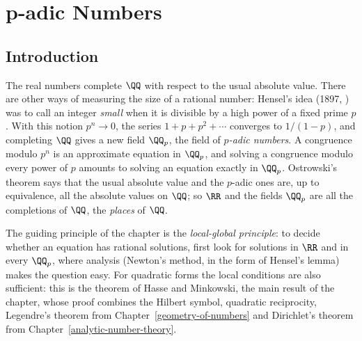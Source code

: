 \chapter{p-adic Numbers}\label{p-adic-numbers}

\section{Introduction}\label{p-adic-numbers:section-introduction}

The real numbers complete $\QQ$ with respect to the usual absolute value. There are other ways of measuring the size of a rational number: Hensel's idea (1897, \cite{hensel-1897}) was to call
an integer \emph{small} when it is divisible by a high power of a fixed prime $p$. With this notion $p^n \to 0$, the series $1 + p + p^2 + \cdots$ converges to $1/(1 - p)$, and completing $\QQ$ gives a new
field $\QQ_p$, the field of \emph{$p$-adic numbers}. A congruence modulo $p^n$ is an approximate equation in $\QQ_p$, and solving a congruence modulo every power of $p$ amounts to solving an equation
exactly in $\QQ_p$. Ostrowski's theorem says that the usual absolute value and the $p$-adic ones are, up to equivalence, all the absolute values on $\QQ$; so $\RR$ and the fields $\QQ_p$ are all the
completions of $\QQ$, the \emph{places} of $\QQ$.

The guiding principle of the chapter is the \emph{local-global principle}: to decide whether an equation has rational solutions, first look for solutions in $\RR$ and in every $\QQ_p$, where analysis
(Newton's method, in the form of Hensel's lemma) makes the question easy. For quadratic forms the local conditions are also sufficient: this is the theorem of Hasse and Minkowski, the main result of the
chapter, whose proof combines the Hilbert symbol, quadratic reciprocity, Legendre's theorem from Chapter~\ref{geometry-of-numbers} and Dirichlet's theorem from Chapter~\ref{analytic-number-theory}.

